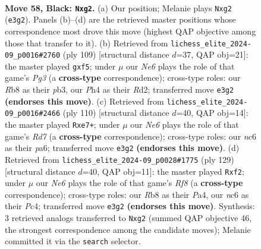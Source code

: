 \documentclass[11pt]{article}
\begin{document}
\clearpage

\begin{figure}[p]\centering
\begin{subfigure}{0.46\textwidth}\centering
\resizebox{\linewidth}{!}{%
\newchessgame
\chessboard[
  setfen={1r6/2R5/2Np1k2/8/6pp/1p2n3/6R1/6K1 b - - 0 58},
  showmover=false,
  pgfstyle=straightmove, color=movearrow, markmove={e3-g2}
]}
\caption{}
\end{subfigure}\hfill
\begin{subfigure}{0.46\textwidth}\centering
\resizebox{\linewidth}{!}{%
\newchessgame
\chessboard[
  setfen={8/4R3/4K1pk/3p1R2/4p3/1P6/3r1P2/8 b - - 0 55},
  showmover=false,
  pgfstyle=straightmove, color=movearrow, markmove={g6-f5}
]}
\caption{}
\end{subfigure}
\\[4pt]
\begin{subfigure}{0.46\textwidth}\centering
\resizebox{\linewidth}{!}{%
\newchessgame
\chessboard[
  setfen={4k3/3Rr3/p7/5R2/2P4r/3P4/3K4/8 w - - 1 56},
  showmover=false,
  pgfstyle=straightmove, color=movearrow, markmove={d7-e7}
]}
\caption{}
\end{subfigure}\hfill
\begin{subfigure}{0.46\textwidth}\centering
\resizebox{\linewidth}{!}{%
\newchessgame
\chessboard[
  setfen={6R1/8/8/8/p1p5/2Pb2Kp/5R2/5r1k b - - 9 65},
  showmover=false,
  pgfstyle=straightmove, color=movearrow, markmove={f1-f2}
]}
\caption{}
\end{subfigure}
\caption{\textbf{Move 58, Black: \texttt{Nxg2}.} (a) Our position; Melanie plays \texttt{Nxg2} (\texttt{e3g2}). Panels (b)--(d) are the retrieved master positions whose correspondence most drove this move (highest QAP objective among those that transfer to it). (b) Retrieved from \texttt{lichess\_elite\_2024-09\_p0016\#2760} (ply 109) [structural distance $d$=37, QAP obj=21]: the master played \texttt{gxf5}; under $\mu$ our \emph{Ne6} plays the role of that game's \emph{Pg3} (a \textbf{cross-type} correspondence); cross-type roles: our \emph{R}b8 as their \emph{p}b3, our \emph{P}h4 as their \emph{R}d2; transferred move \texttt{e3g2} \textbf{(endorses this move)}. (c) Retrieved from \texttt{lichess\_elite\_2024-09\_p0016\#2466} (ply 110) [structural distance $d$=40, QAP obj=14]: the master played \texttt{Rxe7+}; under $\mu$ our \emph{Ne6} plays the role of that game's \emph{Rd7} (a \textbf{cross-type} correspondence); cross-type roles: our \emph{n}c6 as their \emph{p}a6; transferred move \texttt{e3g2} \textbf{(endorses this move)}. (d) Retrieved from \texttt{lichess\_elite\_2024-09\_p0028\#1775} (ply 129) [structural distance $d$=40, QAP obj=11]: the master played \texttt{Rxf2}; under $\mu$ our \emph{Ne6} plays the role of that game's \emph{Rf8} (a \textbf{cross-type} correspondence); cross-type roles: our \emph{R}b8 as their \emph{P}a4, our \emph{n}c6 as their \emph{P}c4; transferred move \texttt{e3g2} \textbf{(endorses this move)}. Synthesis: 3 retrieved analogs transferred to \texttt{Nxg2} (summed QAP objective 46, the strongest correspondence among the candidate moves); Melanie committed it via the \texttt{search} selector.}
\label{fig:thought-m115}
\end{figure}
\end{document}
